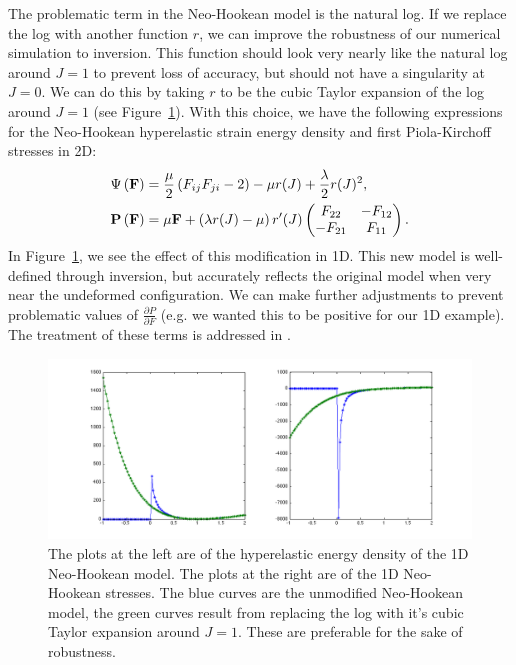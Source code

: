 The problematic term in the Neo-Hookean model is the natural log. If we replace the log with another function $r$, we can improve the robustness of our numerical simulation to inversion. This function should look very nearly like the natural log around $J = 1$ to prevent loss of accuracy, but should not have a singularity at $J = 0$. We can do this by taking $r$ to be the cubic Taylor expansion of the log around $J = 1$ (see Figure~\ref{fig:inversion3}). With this choice, we have the following expressions for the Neo-Hookean hyperelastic strain energy density and first Piola-Kirchoff stresses in 2D:
\begin{align*}
\Psi \left( \mathbf{F} \right) & = \frac{\mu}{2} \left( F_{ij} F_{ji} - 2 \right) - \mu r(J) + \frac{\lambda}{2} r(J)^2, \\
\mathbf{P} \left( \mathbf{F} \right) & = \mu \mathbf{F} + \left( \lambda r(J) -\mu \right) r'(J) \begin{pmatrix} F_{22} & -F_{12} \\
-F_{21} & F_{11} \end{pmatrix}.
\end{align*}
In Figure~\ref{fig:inversion3}, we see the effect of this modification in 1D. This new model is well-defined through inversion, but accurately reflects the original model when very near the undeformed configuration. We can make further adjustments to prevent problematic values of $\frac{\partial P}{\partial F}$ (e.g. we wanted this to be positive for our 1D example). The treatment of these terms is addressed in \cite{Teran05a}.

\begin{figure}
\includegraphics[width=\columnwidth]{images/invertible_neo_hookean}
\caption{The plots at the left are of the hyperelastic energy density of the 1D Neo-Hookean model. The plots at the right are of the 1D Neo-Hookean stresses. The blue curves are the unmodified Neo-Hookean model, the green curves result from replacing the log with it's cubic Taylor expansion around $J = 1$. These are preferable for the sake of robustness.}
\label{fig:inversion3}
\end{figure}


